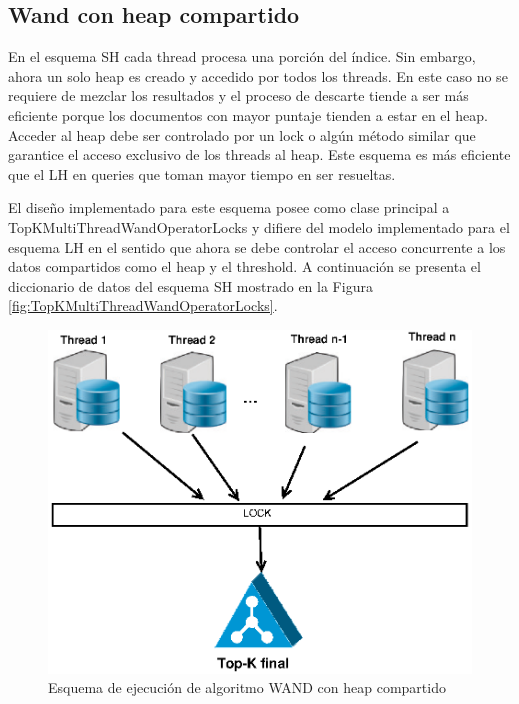 \subsection{Wand con heap compartido}
\label{scheduling:whc}
En el esquema SH cada thread procesa una porción del índice. Sin embargo, ahora un solo heap es creado y accedido por todos los threads. En este caso no se requiere de mezclar los resultados y el proceso de descarte tiende a ser más eficiente porque los documentos con mayor puntaje tienden a estar en el heap. Acceder al heap debe ser controlado por un lock o algún método similar que garantice el acceso exclusivo de los threads al heap. Este esquema es más eficiente que el LH en queries que toman mayor tiempo en ser resueltas.

El diseño implementado para este esquema posee como clase principal a TopKMultiThreadWandOperatorLocks y difiere del modelo implementado para el esquema LH en el sentido que ahora se debe controlar el acceso concurrente a los datos compartidos como el heap y el threshold. A continuación se presenta el diccionario de datos del esquema SH mostrado en la Figura \ref{fig:TopKMultiThreadWandOperatorLocks}.

\begin{figure}[!ht]
\centering
\includegraphics[scale=.75]{images/wand_heaps_compartido.eps}
\caption{Esquema de ejecución de algoritmo WAND con heap compartido}
\label{fig:wand-heap-compartido}
\end{figure}

